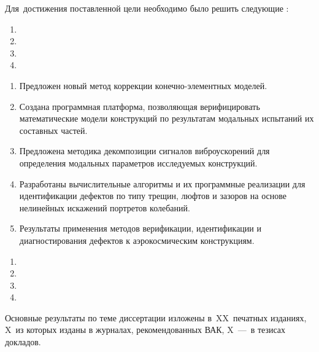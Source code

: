 {\aim} 

Для~достижения поставленной цели необходимо было решить следующие {\tasks}:
\begin{enumerate}[beginpenalty = 10000] 
	\item {}
	\item {}
	\item {}
	\item {}
\end{enumerate}

{\novelty}
\begin{enumerate}[beginpenalty = 10000] 
	\item Предложен новый метод коррекции конечно-элементных моделей. 
	\item Создана программная платформа, позволяющая верифицировать математические модели конструкций по результатам модальных испытаний их составных частей.
	\item Предложена методика декомпозиции сигналов виброускорений для определения модальных параметров исследуемых конструкций.
	\item Разработаны вычислительные алгоритмы и их программные реализации для идентификации дефектов по типу трещин, люфтов и зазоров на основе нелинейных искажений портретов колебаний.
	\item Результаты применения методов верификации, идентификации и диагностирования дефектов к аэрокосмическим конструкциям.
\end{enumerate}

{\influence} 

{\methods} 

{}
\begin{enumerate}[beginpenalty = 10000] 
	\item {}
	\item {}
	\item {}
	\item {}
\end{enumerate}

{\reliability} 



{\contribution} 


{\pasport}


{\publications} 

Основные результаты по теме диссертации изложены в~XX~печатных изданиях, X~из которых изданы в журналах, рекомендованных ВАК, X~---~в тезисах докладов.
